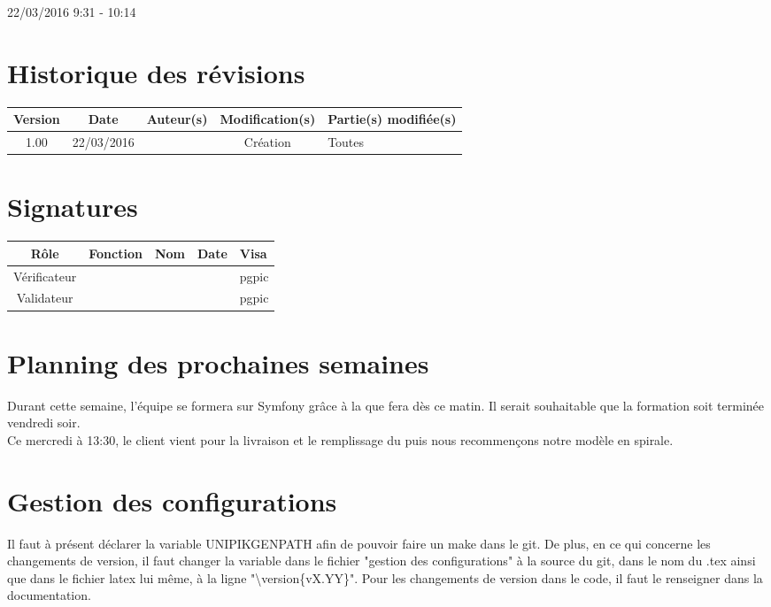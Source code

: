 \documentclass [a4paper] {article}
\begin{document}
22/03/2016			 				%
\hfill   
\hfill 	 9:31 - 10:14 				%



\section*{Historique des révisions}
\begin{center}
			\begin{tabular}{| c | c | c | c | p{4cm} |}
				\hline
				\rowcolor{Gray}
				Version & Date & Auteur(s) & Modification(s) & Partie(s) modifiée(s)		 \\
				\hline
				1.00 & 22/03/2016 & \Pierre & Création & Toutes \\
		\hline		
			\end{tabular}
		\end{center}

\section*{Signatures}

		\begin{center}
			\begin{tabular}{| c | c | c | c | p{4cm} |}
				\hline
				\rowcolor{Gray}
				Rôle & Fonction & Nom & Date & Visa		 \\
				\hline
				Vérificateur & \RQA & \Kafui &  & pgpic \\[30pt]
				\hline
				Validateur & \CP & \Sergi &  & pgpic \\[30pt]	
				\hline
			\end{tabular}
		\end{center}
		
\newpage		



\section{Planning des prochaines semaines}
Durant cette semaine, l'équipe se formera sur Symfony grâce à la \FF{} que \Florian{} fera dès ce matin. Il serait souhaitable que la formation soit terminée vendredi soir. \\
Ce mercredi à 13:30, le client vient pour la livraison et le remplissage du \CDR{} puis nous recommençons notre modèle en spirale.


\section{Gestion des configurations}
Il faut à présent déclarer la variable UNIPIKGENPATH afin de pouvoir faire un make dans le git. De plus, en ce qui concerne les changements de version, il faut changer la variable dans le fichier "gestion des configurations" à la source du git, dans le nom du .tex ainsi que dans le fichier latex lui même, à la ligne "\textbackslash version\{vX.YY\}".
Pour les changements de version dans le code, il faut le renseigner dans la documentation.
\end{document}
